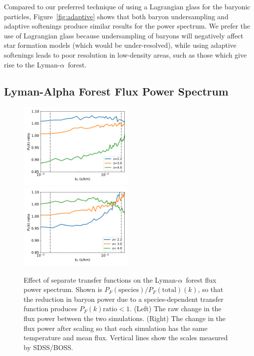 \documentclass[a4paper,11pt]{article}
\newcommand{\Lya}{Lyman-$\alpha$}
\begin{document}
Compared to our preferred technique of using a Lagrangian glass for the baryonic particles, Figure~\ref{fig:adaptive} shows that both baryon undersampling and adaptive softenings produce similar results for the power spectrum. We prefer the use of Lagrangian glass because undersampling of baryons will negatively affect star formation models (which would be under-resolved), while using adaptive softenings leads to poor resolution in low-density areas, such as those which give rise to the \Lya~forest.

\subsection{Lyman-Alpha Forest Flux Power Spectrum}


\begin{figure}
\includegraphics[width=0.5\textwidth]{plots/lya120_relflux_nomf.pdf}
\includegraphics[width=0.5\textwidth]{plots/lya120_relflux_mf_t0.pdf}
\caption{Effect of separate transfer functions on the \Lya~forest flux power spectrum. Shown is $P_F(\mathrm{species})/P_F(\mathrm{total})(k)$, so that the reduction in baryon power due to a species-dependent transfer function produces $P_F(k) \mathrm{ratio} < 1$. (Left) The raw change in the flux power between the two simulations. (Right) The change in the flux power after scaling so that each simulation has the same temperature and mean flux. Vertical lines show the scales measured by SDSS/BOSS.
}
\label{fig:lyaflux}
\end{figure}
\end{document}
